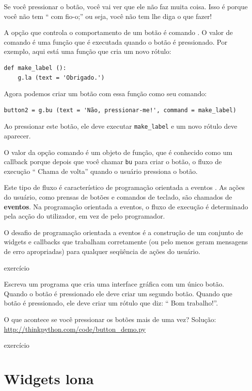 \documentclass[10pt]{book}
\begin{document}
\begin{v erbatim}
Se você pressionar o botão, você vai ver que ele não faz muita coisa.
Isso é porque você não tem `` com fio-o;'' ou seja, você não tem
lhe diga o que fazer!

A opção que controla o comportamento de um botão é {comando \tt}.
O valor de {comando \tt} é uma função que é executada quando
o botão é pressionado. Por exemplo, aqui está uma função que cria
um novo rótulo:

\begin{verbatim}
def make_label ():
    g.la (text = 'Obrigado.')
\end{verbatim}
%
Agora podemos criar um botão com essa função como seu comando:

\begin{verbatim}
button2 = g.bu (text = 'Não, pressionar-me!', command = make_label)
\end{verbatim}
%
Ao pressionar este botão, ele deve executar \verb "make_label"
e um novo rótulo deve aparecer.

O valor da opção {comando \tt}
é um objeto de função, que é conhecido como um callback {\bf} porque
depois que você chamar {\tt bu} para criar o botão, o fluxo de execução
`` Chama de volta'' quando o usuário pressiona o botão.

Este tipo de fluxo é característico de {programação orientada a eventos \bf}.
As ações do usuário, como prensas de botões e comandos de teclado, são chamados de {\bf
eventos}. Na programação orientada a eventos, o fluxo de execução é
determinado pela acção do utilizador, em vez de pelo programador.  

O desafio de programação orientada a eventos é a construção de um conjunto de
widgets e callbacks que trabalham corretamente (ou pelo menos geram
mensagens de erro apropriadas) para qualquer seqüência de ações do usuário.

\begin{} exercício

Escreva um programa que cria uma interface gráfica com um único botão. Quando o
botão é pressionado ele deve criar um segundo botão. Quando
{\Em que} botão é pressionado, ele deve criar um rótulo que
diz: `` Bom trabalho!''.

O que acontece se você pressionar os botões mais de uma vez?
Solução: \url{http://thinkpython.com/code/button_demo.py}

\end{} exercício


\section{Widgets lona}


\end{v erbatim}
\end{document}
